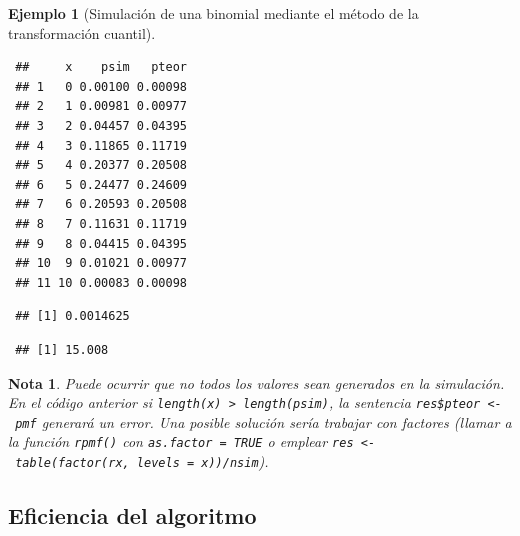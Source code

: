 \documentclass[
  10pt,
]{book}
\newenvironment{Shaded}{\begin{snugshade}}{\end{snugshade}}
\newcommand{\CommentTok}[1]{\textcolor[rgb]{0.56,0.35,0.01}{\textit{#1}}}
\newcommand{\DecValTok}[1]{\textcolor[rgb]{0.00,0.00,0.81}{#1}}
\newcommand{\FunctionTok}[1]{\textcolor[rgb]{0.00,0.00,0.00}{#1}}
\newcommand{\NormalTok}[1]{#1}
\newcommand{\SpecialCharTok}[1]{\textcolor[rgb]{0.00,0.00,0.00}{#1}}
\theoremstyle{break}
\newtheorem{example}{Ejemplo}[chapter]
\theoremstyle{nonumberplain}
\newtheorem{remark}{Nota}
\renewcommand{\CommentTok}[1]{\textcolor[rgb]{0.41,0.41,0.41}{\texttt{#1}}}
\begin{document}
\begin{example}[Simulación de una binomial mediante el método de la transformación cuantil]
\begin{verbatim}
 ##     x    psim   pteor
 ## 1   0 0.00100 0.00098
 ## 2   1 0.00981 0.00977
 ## 3   2 0.04457 0.04395
 ## 4   3 0.11865 0.11719
 ## 5   4 0.20377 0.20508
 ## 6   5 0.24477 0.24609
 ## 7   6 0.20593 0.20508
 ## 8   7 0.11631 0.11719
 ## 9   8 0.04415 0.04395
 ## 10  9 0.01021 0.00977
 ## 11 10 0.00083 0.00098
\end{verbatim}

\begin{Shaded}
\end{Shaded}

\begin{verbatim}
 ## [1] 0.0014625
\end{verbatim}

\begin{Shaded}
\end{Shaded}

\begin{verbatim}
 ## [1] 15.008
\end{verbatim}

\end{example}

\begin{remark}
Puede ocurrir que no todos los valores sean generados en la simulación.
En el código anterior si \texttt{length(x)\ \textgreater{}\ length(psim)}, la sentencia \texttt{res\$pteor\ \textless{}-\ pmf} generará un error.
Una posible solución sería trabajar con factores (llamar a la función \texttt{rpmf()} con \texttt{as.factor\ =\ TRUE} o emplear \texttt{res\ \textless{}-\ table(factor(rx,\ levels\ =\ x))/nsim}).
\end{remark}

\hypertarget{eficiencia-del-algoritmo-1}{%
\subsection{Eficiencia del algoritmo}\label{eficiencia-del-algoritmo-1}}
\end{document}
